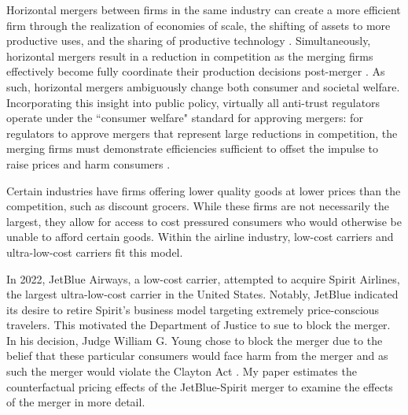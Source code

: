 \documentclass{article}
\begin{document}
    
    Horizontal mergers between firms in the same industry can create a more efficient firm through the realization of economies of scale, the shifting of assets to more productive uses, and the sharing of productive technology \citep{williamson_economies_1968, farrell_horizontal_1990, kaplow_improving_2025}. Simultaneously, horizontal mergers result in a reduction in competition as the merging firms effectively become fully coordinate their production decisions post-merger \citep{stigler_theory_1964}. As such, horizontal mergers ambiguously change both consumer and societal welfare. Incorporating this insight into public policy, virtually all anti-trust regulators operate under the  ``consumer welfare" standard for approving mergers: for regulators to approve mergers that represent large reductions in competition, the merging firms must demonstrate efficiencies sufficient to offset the impulse to raise prices and harm consumers \citep{whinston_chapter_2007}. %

    Certain industries have firms offering lower quality goods at lower prices than the competition, such as discount grocers. While these firms are not necessarily the largest, they allow for access to cost pressured consumers who would otherwise be unable to afford certain goods. Within the airline industry, low-cost carriers and ultra-low-cost carriers fit this model. 

    In 2022, JetBlue Airways, a low-cost carrier, attempted to acquire Spirit Airlines, the largest ultra-low-cost carrier in the United States. Notably, JetBlue indicated its desire to retire Spirit's business model targeting extremely price-conscious travelers.   This motivated the Department of Justice to sue to block the merger. In his decision, Judge William G. Young chose to block the merger due to the belief that these particular consumers would face harm from the merger and as such the merger would violate the Clayton Act \citep{william_g_young_findings_2024}.  My paper estimates the counterfactual pricing effects of the JetBlue-Spirit merger to examine the effects of the merger in more detail. 
    
\end{document}

